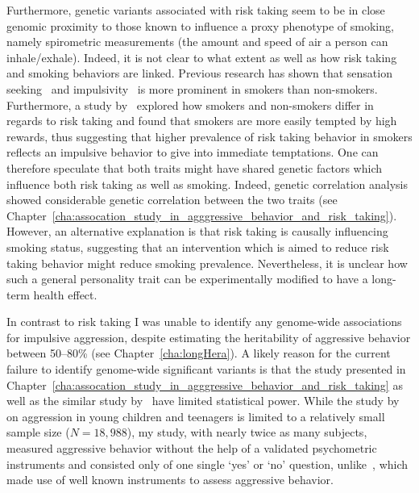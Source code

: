 Furthermore, genetic variants associated with risk taking seem to be in close genomic proximity to those known to influence a proxy phenotype of smoking, namely spirometric measurements (the amount and speed of air a person can inhale/exhale).
Indeed, it is not clear to what extent as well as how risk taking and smoking behaviors are linked.
Previous research has shown that sensation seeking~\cite{Carton1994} and impulsivity~\cite{Glicksohn2007,Mitchell1999} is more prominent in smokers than non-smokers.
Furthermore, a study by~\citet{Ert2013} explored how smokers and non-smokers differ in regards to risk taking and found that smokers are more easily tempted by high rewards,
thus suggesting that higher prevalence of risk taking behavior in smokers reflects an impulsive behavior to give into immediate temptations. 
One can therefore speculate that both traits might have shared genetic factors which influence both risk taking as well as smoking.
Indeed, genetic correlation analysis showed considerable genetic correlation between the two traits (see Chapter~\ref{cha:assocation_study_in_agggressive_behavior_and_risk_taking}).
However, an alternative explanation is that risk taking is causally influencing smoking status,
suggesting that an intervention which is aimed to reduce risk taking behavior might reduce smoking prevalence. 
Nevertheless, it is unclear how such a general personality trait can be experimentally modified to have a long-term health effect.

In contrast to risk taking I was unable to identify any genome-wide associations for impulsive aggression, despite estimating the heritability of aggressive behavior between 50--80\% (see Chapter~\ref{cha:longHera}).
A likely reason for the current failure to identify genome-wide significant variants is that the study presented in Chapter~\ref{cha:assocation_study_in_agggressive_behavior_and_risk_taking} as well as the similar study by~\citet{Pappa2016a} have limited statistical power.
While the study by~\cite{Pappa2016a} on aggression in young children and teenagers is limited to a relatively small sample size ($N=18,988$),
my study, with nearly twice as many subjects, measured aggressive behavior without the help of a validated psychometric instruments and consisted only of one single `yes' or `no' question, unlike~\citet{Pappa2016a}, which made use of well known instruments to assess aggressive behavior.

